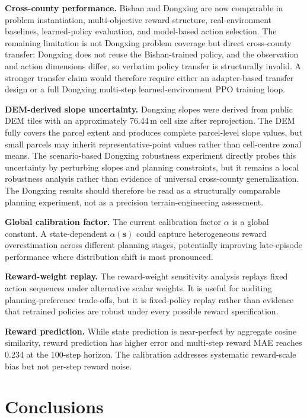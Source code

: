 \documentclass[11pt]{article}
\begin{document}
\textbf{Cross-county performance.} Bishan and Dongxing are now comparable in problem instantiation, multi-objective reward structure, real-environment baselines, learned-policy evaluation, and model-based action selection. The remaining limitation is not Dongxing problem coverage but direct cross-county transfer: Dongxing does not reuse the Bishan-trained policy, and the observation and action dimensions differ, so verbatim policy transfer is structurally invalid. A stronger transfer claim would therefore require either an adapter-based transfer design or a full Dongxing multi-step learned-environment PPO training loop.

\textbf{DEM-derived slope uncertainty.} Dongxing slopes were derived from public DEM tiles with an approximately 76.44\,m cell size after reprojection. The DEM fully covers the parcel extent and produces complete parcel-level slope values, but small parcels may inherit representative-point values rather than cell-centre zonal means. The scenario-based Dongxing robustness experiment directly probes this uncertainty by perturbing slopes and planning constraints, but it remains a local robustness analysis rather than evidence of universal cross-county generalization. The Dongxing results should therefore be read as a structurally comparable planning experiment, not as a precision terrain-engineering assessment.

\textbf{Global calibration factor.} The current calibration factor $\alpha$ is a global constant. A state-dependent $\alpha(\mathbf{s})$ could capture heterogeneous reward overestimation across different planning stages, potentially improving late-episode performance where distribution shift is most pronounced.

\textbf{Reward-weight replay.} The reward-weight sensitivity analysis replays fixed action sequences under alternative scalar weights. It is useful for auditing planning-preference trade-offs, but it is fixed-policy replay rather than evidence that retrained policies are robust under every possible reward specification.

\textbf{Reward prediction.} While state prediction is near-perfect by aggregate cosine similarity, reward prediction has higher error and multi-step reward MAE reaches 0.234 at the 100-step horizon. The calibration addresses systematic reward-scale bias but not per-step reward noise.


\section{Conclusions}
\label{sec:conclusions}
\end{document}
